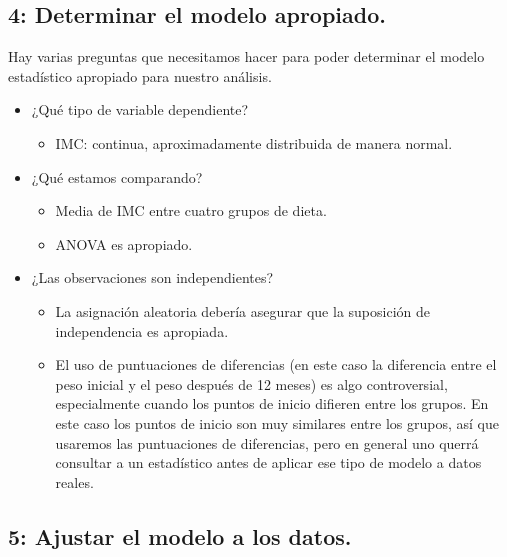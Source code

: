 \documentclass[
  12pt,
]{book}
\providecommand{\tightlist}{%
  \setlength{\itemsep}{0pt}\setlength{\parskip}{0pt}}
\begin{document}
\hypertarget{determinar-el-modelo-apropiado.}{%
\subsection{4: Determinar el modelo apropiado.}\label{determinar-el-modelo-apropiado.}}

Hay varias preguntas que necesitamos hacer para poder determinar el modelo estadístico apropiado para nuestro análisis.

\begin{itemize}
\tightlist
\item
  ¿Qué tipo de variable dependiente?

  \begin{itemize}
  \tightlist
  \item
    IMC: continua, aproximadamente distribuida de manera normal.
  \end{itemize}
\item
  ¿Qué estamos comparando?

  \begin{itemize}
  \tightlist
  \item
    Media de IMC entre cuatro grupos de dieta.
  \item
    ANOVA es apropiado.
  \end{itemize}
\item
  ¿Las observaciones son independientes?

  \begin{itemize}
  \tightlist
  \item
    La asignación aleatoria debería asegurar que la suposición de independencia es apropiada.
  \item
    El uso de puntuaciones de diferencias (en este caso la diferencia entre el peso inicial y el peso después de 12 meses) es algo controversial, especialmente cuando los puntos de inicio difieren entre los grupos. En este caso los puntos de inicio son muy similares entre los grupos, así que usaremos las puntuaciones de diferencias, pero en general uno querrá consultar a un estadístico antes de aplicar ese tipo de modelo a datos reales.
  \end{itemize}
\end{itemize}

\hypertarget{ajustar-el-modelo-a-los-datos.}{%
\subsection{5: Ajustar el modelo a los datos.}\label{ajustar-el-modelo-a-los-datos.}}
\end{document}
